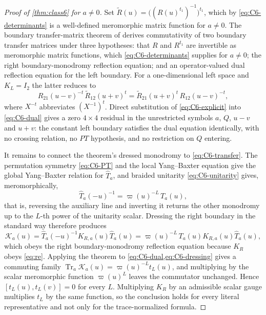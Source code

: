 \documentclass[11pt,reqno]{amsart}
\theoremstyle{plain}
\theoremstyle{definition}
\theoremstyle{remark}
\numberwithin{equation}{section}
\newcommand{\Tr}{\operatorname{Tr}}
\newcommand{\Id}{I_2}
\begin{document}
\begin{proof}[Proof of \cref{thm:class6} for $a\ne0$]
Set $\widetilde R(u)=\bigl((R(u)^{t_1})^{-1}\bigr)^{t_1}$, which by
\cref{eq:C6-determinants} is a well-defined meromorphic matrix function for
$a\ne0$. The boundary transfer-matrix theorem of \cite[Thm.~2.4]{Vlaar_2015bt}
derives commutativity of two boundary transfer matrices under three hypotheses:
that $R$ and $R^{t_1}$ are invertible as meromorphic matrix functions, which
\cref{eq:C6-determinants} supplies for $a\ne0$; the right boundary-monodromy
reflection equation; and an operator-valued dual reflection equation for the
left boundary. For a one-dimensional left space and
$K_L=\Id$ the latter reduces to
\begin{equation}
R_{21}(u-v)^{-t}\,\widetilde R_{12}(u+v)^{t}
=\widetilde R_{21}(u+v)^{t}\,R_{12}(u-v)^{-t},
\label{eq:C6-dual}
\end{equation}
where $X^{-t}$ abbreviates $(X^{-1})^t$. Direct substitution of
\cref{eq:C6-explicit} into \cref{eq:C6-dual} gives a zero $4\times4$ residual in
the unrestricted symbols $a$, $Q$, $u-v$ and $u+v$: the constant left boundary
satisfies the dual equation identically, with no crossing relation, no $PT$
hypothesis, and no restriction on $Q$ entering.

It remains to connect the theorem's dressed monodromy to \cref{eq:C6-transfer}.
The permutation symmetry \cref{eq:C6-PT} and the local Yang--Baxter equation give
the global Yang--Baxter relation for $\widehat T_a$, and braided unitarity
\cref{eq:C6-unitarity} gives, meromorphically,
\begin{equation}
\widehat T_a(-u)^{-1}=\varpi(u)^{-L}\,T_a(u),
\label{eq:C6-unitarity-monodromy}
\end{equation}
that is, reversing the auxiliary line and inverting it returns the other
monodromy up to the $L$-th power of the unitarity scalar. Dressing the right
boundary in the standard way therefore produces
\begin{equation}
\mathcal K_a(u)
=\widehat T_a(-u)^{-1}K_{R,a}(u)\widehat T_a(u)
=\varpi(u)^{-L}\,T_a(u)K_{R,a}(u)\widehat T_a(u),
\label{eq:C6-dressing}
\end{equation}
which obeys the right boundary-monodromy reflection equation because $K_R$ obeys
\cref{eq:re}. Applying the theorem to \cref{eq:C6-dual,eq:C6-dressing} gives a
commuting family $\Tr_a\mathcal K_a(u)=\varpi(u)^{-L}t_L(u)$, and multiplying by
the scalar meromorphic function $\varpi(u)^{L}$ leaves the commutator unchanged.
Hence $[t_L(u),t_L(v)]=0$ for every $L$. Multiplying $K_R$ by an admissible
scalar gauge multiplies $t_L$ by the same function, so the conclusion holds for
every literal representative and not only for the trace-normalized formula.
\end{proof}
\end{document}
